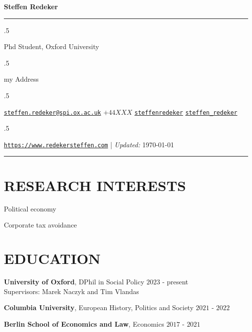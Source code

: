 \documentclass[11pt,]{article}
\providecommand{\tightlist}{%
  \setlength{\itemsep}{0pt}\setlength{\parskip}{0pt}}
\renewenvironment{itemize}{
  \begin{list}{}{
    \setlength{\leftmargin}{1.5em}
  }
}{
  \end{list}
}
\begin{document}
\centerline{\huge \bf Steffen Redeker}

\vspace{2 mm}

\hrule

\vspace{2 mm}

\moveleft.5\hoffset\centerline{Phd Student, Oxford University}
\moveleft.5\hoffset\centerline{my Address}
\moveleft.5\hoffset\centerline{ \faEnvelopeO \hspace{1 mm} \href{mailto:}{\tt \href{mailto:steffen.redeker@spi.ox.ac.uk}{\nolinkurl{steffen.redeker@spi.ox.ac.uk}}} \hspace{1 mm}  \faPhone \hspace{1 mm}  \(+44 XXX\)  \hspace{1 mm}  \faGithub \hspace{1 mm} \href{http://github.com/steffenredeker}{\tt steffenredeker} \hspace{1 mm}   \faTwitter \hspace{1 mm} \href{https:/twitter.com/steffen\_redeker}{\tt steffen\_redeker} \hspace{1 mm}  }
\moveleft.5\hoffset\centerline{ \faGlobe \hspace{1 mm} \href{http://\url{https://www.redekersteffen.com}}{\tt \url{https://www.redekersteffen.com}}    | \emph{Updated:} \today }

\vspace{2 mm}

\hrule


\section{RESEARCH INTERESTS}\label{research-interests}

\begin{itemize}
\tightlist
\item
  Political economy
\item
  Corporate tax avoidance
\end{itemize}

\section{EDUCATION}\label{education}

\begin{itemize}
\item
  \textbf{University of Oxford}, DPhil in Social Policy \hfill \(2023\)
  - present\\
  Supervisors: Marek Naczyk and Tim Vlandas
\item
  \textbf{Columbia University}, European History, Politics and Society
  \hfill \(2021\) - \(2022\)\\
\item
  \textbf{Berlin School of Economics and Law}, Economics \hfill \(2017\)
  - \(2021\)\\
\end{itemize}
\end{document}
